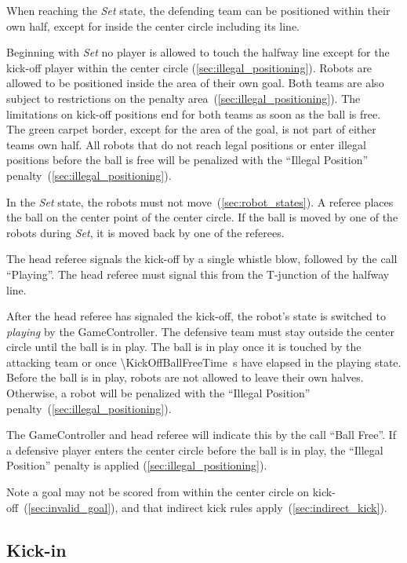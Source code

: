 When reaching the \textit{Set} state, the defending team can be positioned within their own half, except for inside the center circle including its line.

Beginning with \textit{Set} no player is allowed to touch the halfway line except for the kick-off player within the center circle (\cf \cref{sec:illegal_positioning}).
Robots are allowed to be positioned inside the area of their own goal.
Both teams are also subject to restrictions on the penalty area~(\cf \cref{sec:illegal_positioning}).
The limitations on kick-off positions end for both teams as soon as the ball is free.
The green carpet border, except for the area of the goal, is not part of either teams own half.
All robots that do not reach legal positions or enter illegal positions before the ball is free will be penalized with the ``Illegal Position'' penalty~(\cf \cref{sec:illegal_positioning}).

In the \emph{Set} state, the robots must not move~(\cf \cref{sec:robot_states}). A referee places the ball on the center point of the center circle. If the ball is moved by one of the robots during \textit{Set}, it is moved back by one of the referees.

The head referee signals the kick-off by a single whistle blow, followed by the call ``Playing''. The head referee must signal this from the T-junction of the halfway line.

After the head referee has signaled the kick-off, the robot's state is switched to \emph{playing} by the GameController.
The defensive team must stay outside the center circle until the ball is in play. The ball is in play once it is touched by the attacking team or once \qty{\KickOffBallFreeTime}{\second} have elapsed in the playing state. Before the ball is in play, robots are not allowed to leave their own halves. Otherwise, a robot will be penalized with the ``Illegal Position'' penalty~(\cf \cref{sec:illegal_positioning}).

The GameController and head referee will indicate this by the call ``Ball Free''.
If a defensive player enters the center circle before the ball is in play, the ``Illegal Position'' penalty is applied (\cf \cref{sec:illegal_positioning}).

Note a goal may not be scored from within the center circle on kick-off~(\cf \cref{sec:invalid_goal}), and that indirect kick rules apply~(\cf \cref{sec:indirect_kick}).

\subsection{Kick-in}
\label{sec:kick_in}

